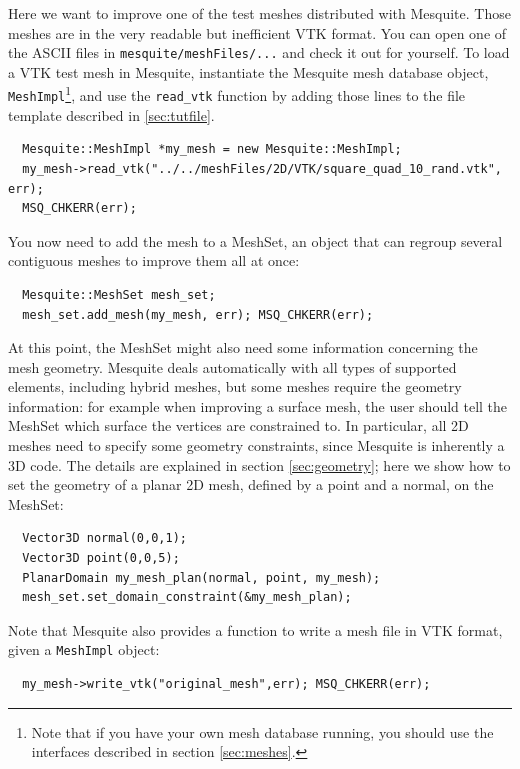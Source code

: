 \documentclass[letter]{report}
\begin{document}
Here we want to improve one of the test meshes distributed with Mesquite. Those meshes are in
the very readable but inefficient VTK format. You can open one of the ASCII files in
\texttt{mesquite/meshFiles/...} and check it out for yourself.
To load a VTK test mesh in Mesquite, instantiate the Mesquite mesh database object,
\texttt{MeshImpl}\footnote{Note that if you have your own mesh
database running, you should use the interfaces described in section \ref{sec:meshes}.}, 
and use the \texttt{read\_vtk} function by adding those lines to the file
template described in \ref{sec:tutfile}.
\begin{verbatim}
  Mesquite::MeshImpl *my_mesh = new Mesquite::MeshImpl;
  my_mesh->read_vtk("../../meshFiles/2D/VTK/square_quad_10_rand.vtk", err); 
  MSQ_CHKERR(err);
\end{verbatim}
You now need to add the mesh to a MeshSet, an object that can regroup several contiguous meshes to
improve them all at once:
\begin{verbatim}
  Mesquite::MeshSet mesh_set;
  mesh_set.add_mesh(my_mesh, err); MSQ_CHKERR(err);
\end{verbatim}
At this point, the MeshSet might also need some information concerning the mesh geometry. Mesquite
deals automatically with all types of supported elements, including hybrid meshes, but some meshes
require the geometry information: for example when improving a surface mesh, the user should tell
the MeshSet which surface the vertices are constrained to. In particular, all 2D meshes need to
specify some geometry constraints, since Mesquite is inherently a 3D code. 
The details are explained in section
\ref{sec:geometry}; here we show how to set the geometry of a planar 2D mesh, defined by a point and
a normal, on the MeshSet: 
\begin{verbatim}
  Vector3D normal(0,0,1);
  Vector3D point(0,0,5);
  PlanarDomain my_mesh_plan(normal, point, my_mesh);
  mesh_set.set_domain_constraint(&my_mesh_plan);
\end{verbatim}

Note that Mesquite also provides a function to write a mesh file in VTK format, given a \texttt{MeshImpl}
object: 
\begin{verbatim}
  my_mesh->write_vtk("original_mesh",err); MSQ_CHKERR(err);
\end{verbatim}
\end{document}
